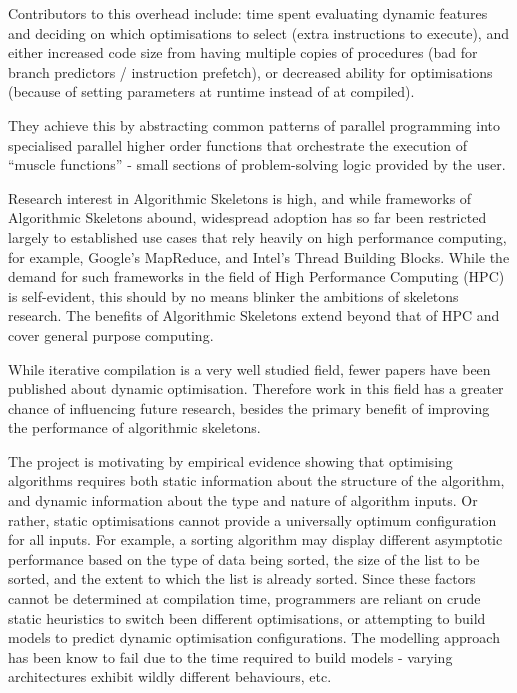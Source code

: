 Contributors to this overhead include: time spent evaluating dynamic
features and deciding on which optimisations to select (extra
instructions to execute), and either increased code size from having
multiple copies of procedures (bad for branch predictors / instruction
prefetch), or decreased ability for optimisations (because of setting
parameters at runtime instead of at compiled).

They achieve this by abstracting common patterns of parallel
programming into specialised parallel higher order functions that
orchestrate the execution of ``muscle functions'' - small sections of
problem-solving logic provided by the user.

Research interest in Algorithmic Skeletons is high, and while
frameworks of Algorithmic Skeletons abound, widespread adoption has so
far been restricted largely to established use cases that rely heavily
on high performance computing, for example, Google's MapReduce, and
Intel's Thread Building Blocks. While the demand for such frameworks
in the field of High Performance Computing (HPC) is self-evident, this
should by no means blinker the ambitions of skeletons research. The
benefits of Algorithmic Skeletons extend beyond that of HPC and cover
general purpose computing.



While iterative compilation is a very well studied field, fewer papers
have been published about dynamic optimisation. Therefore work in this
field has a greater chance of influencing future research, besides the
primary benefit of improving the performance of algorithmic skeletons.

The project is motivating by empirical evidence showing that
optimising algorithms requires both static information about the
structure of the algorithm, and dynamic information about the type and
nature of algorithm inputs. Or rather, static optimisations cannot
provide a universally optimum configuration for all inputs. For
example, a sorting algorithm may display different asymptotic
performance based on the type of data being sorted, the size of the
list to be sorted, and the extent to which the list is already
sorted. Since these factors cannot be determined at compilation time,
programmers are reliant on crude static heuristics to switch been
different optimisations, or attempting to build models to predict
dynamic optimisation configurations. The modelling approach has been
know to fail due to the time required to build models - varying
architectures exhibit wildly different behaviours, etc.

